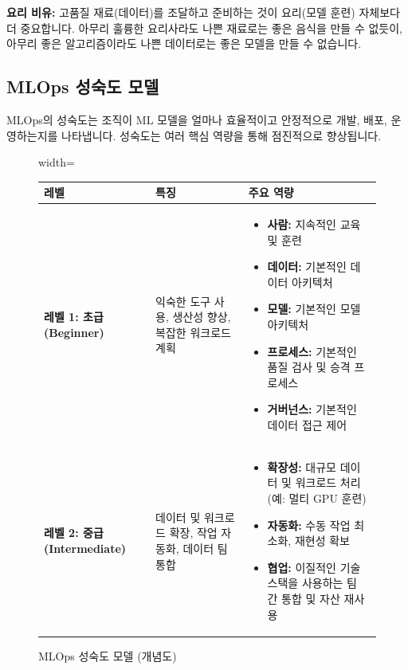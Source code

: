 \documentclass[11pt,a4paper]{article}
\theoremstyle{definition}
\begin{document}
\begin{tipbox}
\textbf{요리 비유:}
고품질 재료(데이터)를 조달하고 준비하는 것이 요리(모델 훈련) 자체보다 더 중요합니다. 아무리 훌륭한 요리사라도 나쁜 재료로는 좋은 음식을 만들 수 없듯이, 아무리 좋은 알고리즘이라도 나쁜 데이터로는 좋은 모델을 만들 수 없습니다.
\end{tipbox}

\subsection{MLOps 성숙도 모델}

MLOps의 성숙도는 조직이 ML 모델을 얼마나 효율적이고 안정적으로 개발, 배포, 운영하는지를 나타냅니다. 성숙도는 여러 핵심 역량을 통해 점진적으로 향상됩니다.

\begin{figure}[h!]
    \centering
    \caption{MLOps 성숙도 모델 (개념도)}
    \label{fig:mlops_maturity}
    \begin{adjustbox}{width=\textwidth}
    \begin{tabular}{p{} | p{} | p{}}
    \toprule
    \textbf{레벨} & \textbf{특징} & \textbf{주요 역량} \\
    \midrule
    \textbf{레벨 1: 초급 (Beginner)} & 익숙한 도구 사용, 생산성 향상, 복잡한 워크로드 계획 &
    \begin{itemize}
        \item \textbf{사람:} 지속적인 교육 및 훈련
        \item \textbf{데이터:} 기본적인 데이터 아키텍처
        \item \textbf{모델:} 기본적인 모델 아키텍처
        \item \textbf{프로세스:} 기본적인 품질 검사 및 승격 프로세스
        \item \textbf{거버넌스:} 기본적인 데이터 접근 제어
    \end{itemize} \\
    \midrule
    \textbf{레벨 2: 중급 (Intermediate)} & 데이터 및 워크로드 확장, 작업 자동화, 데이터 팀 통합 &
    \begin{itemize}
        \item \textbf{확장성:} 대규모 데이터 및 워크로드 처리 (예: 멀티 GPU 훈련)
        \item \textbf{자동화:} 수동 작업 최소화, 재현성 확보
        \item \textbf{협업:} 이질적인 기술 스택을 사용하는 팀 간 통합 및 자산 재사용
    \end{itemize} \\

\end{tabular}
\end{adjustbox}
\end{figure}
\end{document}
